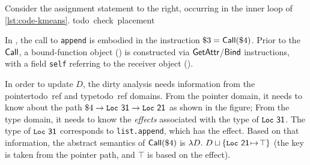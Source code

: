 \begin{example}
Consider the assignment statement to the right,
occurring in the inner loop of \autoref{lst:code-kmeans}.
\si{todo check placement}
\end{example}

\bgroup
\setlength\intextsep{-10pt}
\begin{wrapfigure}{r}{0.3\textwidth}
\vspace{5pt}
\end{wrapfigure}

%
In \spytecode, the call to \lstinline|append| is embodied
in the instruction $\$3 = \textsf{Call}(\$4)$.
Prior to the $\textsf{Call}$, a bound-function object () is
constructed via $\textsf{GetAttr}$/$\textsf{Bind}$ instructions, with a field
\lstinline|self| referring to the receiver object ().

In order to update $D$, the dirty analysis needs information from the pointer\si{todo ref} and type\si{todo ref} domains.
From the pointer domain, it needs to know about the path $\$4\to\textsf{\texttt{\small Loc}~{31}} \to \textsf{\texttt{\small Loc}~{21}}$
as shown in the figure;
From the type domain, it needs to know the \emph{effects}
associated with the type of $\textsf{\texttt{\small Loc}~{31}}$.
The type of $\textsf{\texttt{\small Loc}~{31}}$ corresponds to \texttt{list.append},
which has the \tupdate effect.
Based on that information, the abstract semantics of
$\textsf{Call}(\$4)$ is $\lambda D.~D\sqcup\{\textsf{\texttt{\small Loc}~{21}}{\hspace{1pt}\mapsto\hspace{1pt}}\top\}$ (the key  is taken from the pointer path, and $\top$ is based on the \tupdate
effect).


